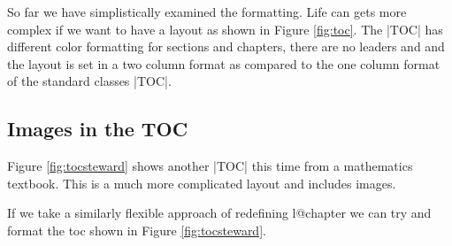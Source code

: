 So far we have simplistically examined the formatting. Life can gets more complex if we want to have a layout as shown in Figure \ref{fig:toc}. The |TOC| has different color formatting for sections and chapters, there are no leaders and and the layout is set in a two column format as compared to the one column format of the standard classes |TOC|.




\begin{teXXX}
\renewcommand\l@chapter[3]{%
  \ifnum \c@tocdepth >\m@ne
    \addpenalty{-\@highpenalty}%
    \vskip 1.0em \@plus\p@
    \setlength\@tempdima{1.5em}%
    \begingroup
      \parindent \z@ \rightskip \@pnumwidth
      \parfillskip -\@pnumwidth
      \leavevmode
      \advance\leftskip\@tempdima
      \hskip -\leftskip
      \vbox{\raggedright#1\vskip1pt%
      \hrule width3cm height0.4pt}\par
      #2
      \penalty\@highpenalty
    \endgroup
  \fi}
\end{teXXX}



\subsection{Images in the TOC}
Figure \ref{fig:tocsteward} shows another |TOC| this time from a mathematics textbook. This is a much more complicated layout and includes images.

If we take a similarly flexible approach of redefining l@chapter we can try and format the toc shown in Figure \ref{fig:tocsteward}.



\begin{teXXX}
\renewcommand\l@chapter[3]{%
  \ifnum \c@tocdepth >\m@ne
    \addpenalty{-\@highpenalty}%
    \vskip 1.0em \@plus\p@
    \begingroup
      \parindent \z@
      \leavevmode
      \vbox{\raggedright\colorbox{blue}{\color{white}\bfseries \sffamily#1} #2\qquad  #3\vskip0pt%
      \color{blue}\hrule width0.7\textwidth height0.4pt}\par
      \penalty\@highpenalty
    \endgroup
  \fi}
\end{teXXX}




